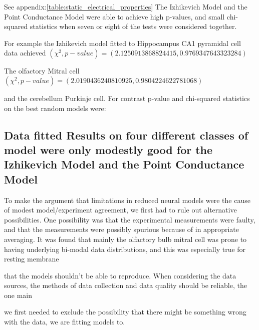 
See appendix:\ref{table:static_electrical_properties}
The Izhikevich Model and the Point Conductance Model were able to achieve high p-values, and small chi-squared statistics when seven or eight of the tests were considered together.

For example the Izhikevich model fitted to Hippocampus CA1 pyramidal cell data achieved $ (\chi^{2} ,p-value) =(2.1250913868824415, 0.9769347643323284) $

The olfactory Mitral cell
$ (\chi^{2} ,p-value) =(2.0190436240810925, 0.9804224622781068) $

and the cerebellum Purkinje cell. For contrast p-value and chi-squared statistics on the best random models were:

\subsection{Data fitted Results on four different classes of model were only modestly good for the Izhikevich Model and the Point Conductance Model}

To make the argument that limitations in reduced neural models were the cause of modest model/experiment agreement, we first had to rule out alternative possibilities. One possibility was that the experimental measurements were faulty, and that the measurements were possibly spurious because of in appropriate averaging. It was found that mainly the olfactory bulb mitral cell was prone to having underlying bi-modal data distributions, and this was especially true for resting membrane

that the models shouldn't be able to reproduce. When considering the data sources, the methods of data collection and data quality should be reliable, the one main 

we first needed to exclude the possibility that there might be something wrong with the data, we are fitting models to.

